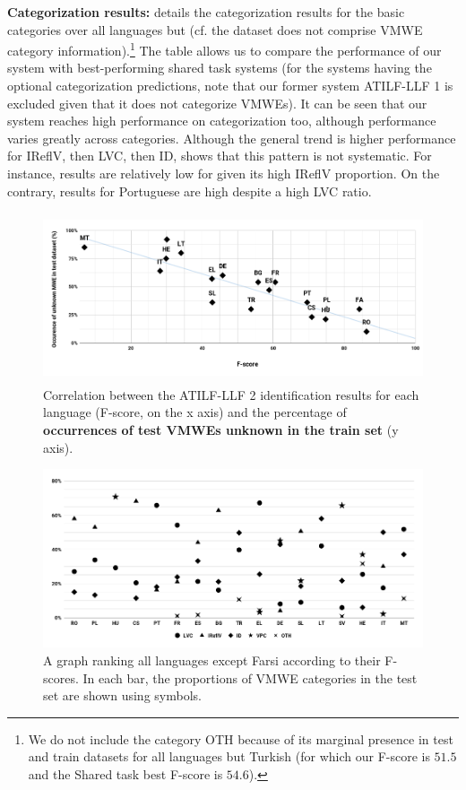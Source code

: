 \documentclass[output=paper,modfonts]{langscibook}
\begin{document}
\textbf{Categorization results: } details the categorization results for the basic categories over all languages but  (cf. the  dataset does not comprise VMWE category information).\footnote{We do not include the category OTH because of its marginal presence in test and train datasets for all languages but Turkish (for which our F-score is $51.5$ and the Shared task best F-score is $54.6$).} The table allows us to compare the performance of our system with best-performing shared task systems (for the systems having the optional categorization predictions, note that our former system ATILF-LLF 1 is excluded given that it does not categorize VMWEs). It can be seen that our system reaches high performance on categorization too, although performance varies greatly across categories. Although the general trend is higher performance for IReflV, then LVC, then ID,  shows that this pattern is not systematic. For instance, results are relatively low for  given its high IReflV proportion. On the contrary, results for Portuguese are high despite a high LVC ratio.
\begin{figure}[H]
\includegraphics[height=5cm,keepaspectratio]{figures/alsaied-graph1.png}
\caption{Correlation between the ATILF-LLF 2 identification results for each language (F-score, on the x axis) and the percentage of \textbf{occurrences of test VMWEs unknown in the train set} (y axis).}
\label{fig:correlation}
\end{figure}
\begin{figure}[H]
\includegraphics[width=\linewidth]{figures/alsaied-cats.png}
\caption{A graph ranking all languages except Farsi according to their F-scores. In each bar, the proportions of VMWE categories in the test set are shown using symbols.}
\label{fig:cats}
\end{figure}
\end{document}
